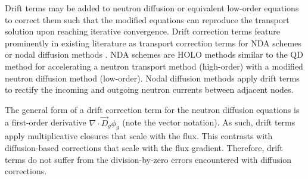 
Drift terms may be added to neutron diffusion or equivalent low-order equations to correct them
such that the modified equations can reproduce the transport solution upon reaching iterative
convergence. Drift correction terms feature prominently in existing literature as transport
correction terms for \gls{NDA} schemes or nodal diffusion methods
\cite{smith_nodal_1983, smith_assembly_1986, adams_fast_2002, wang_diffusion_2014}. \gls{NDA}
schemes are \gls{HOLO} methods \cite{chacon_multiscale_2017} similar to the \gls{QD} method for
accelerating a neutron transport
method (high-order) with a modified neutron diffusion method (low-order). Nodal
diffusion methods apply drift terms to rectify the incoming and outgoing neutron
currents between adjacent nodes.

The general form of a drift correction term for the neutron diffusion equations is a
first-order derivative $\nabla\cdot \vec{D}_g\phi_g$ (note the vector notation). As such,
drift terms apply
multiplicative closures that scale with the flux. This contrasts with diffusion-based
corrections that scale with the flux gradient. Therefore, drift terms do not suffer from
the division-by-zero errors encountered with diffusion corrections.

